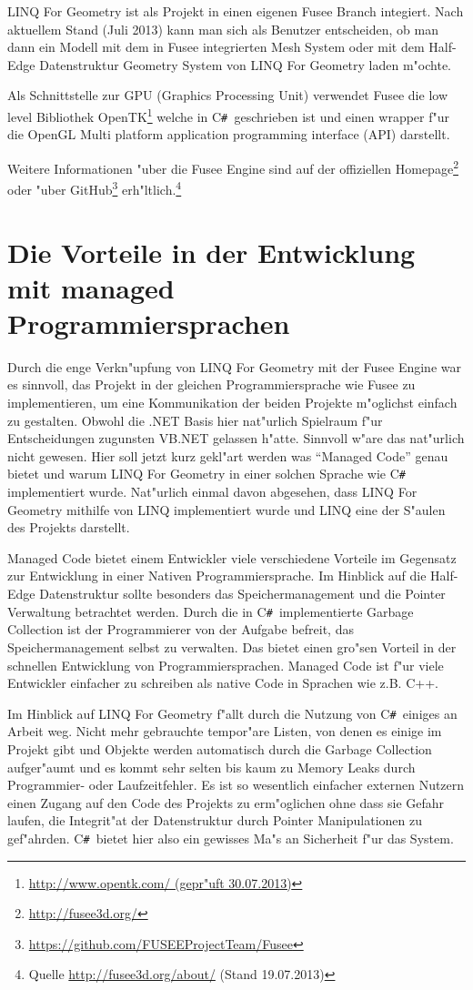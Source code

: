 \documentclass[pagesize, paper=a4, fontsize=12pt,titlepage=true, headings=small, headnosepline, abstractoff, liststotoc, nochapterprefix, plainheadsepline]{scrreprt}
\newcommand{\CSS}{C\texttt{\# }}
\newcommand{\LFGS}{LINQ For Geometry }
\newcommand{\HES}{Half-Edge Datenstruktur }
\begin{document}
\LFGS ist als Projekt in einen eigenen Fusee Branch integiert. Nach aktuellem Stand (Juli 2013) kann man sich als Benutzer entscheiden, ob man dann ein Modell mit dem in Fusee integrierten Mesh System oder mit dem \HES Geometry System von \LFGS laden m"ochte.

Als Schnittstelle zur GPU (Graphics Processing Unit) verwendet Fusee die low level Bibliothek OpenTK\footnote{\url{http://www.opentk.com/ (gepr"uft 30.07.2013)}} welche in \CSS geschrieben ist und einen wrapper f"ur die OpenGL Multi platform application programming interface (API) darstellt.

Weitere Informationen "uber die Fusee Engine sind auf der offiziellen Homepage\footnote{\url{http://fusee3d.org/}} oder "uber GitHub\footnote{\url{https://github.com/FUSEEProjectTeam/Fusee}} erh"ltlich.\footnote{Quelle \url{http://fusee3d.org/about/} (Stand 19.07.2013)}
\section {Die Vorteile in der Entwicklung mit managed Programmiersprachen}\label{sec:VorteileManaged}
Durch die enge Verkn"upfung von \LFGS mit der Fusee Engine war es sinnvoll, das Projekt in der gleichen Programmiersprache wie Fusee zu implementieren, um eine Kommunikation der beiden Projekte m"oglichst einfach zu gestalten. Obwohl die .NET Basis hier nat"urlich Spielraum f"ur Entscheidungen zugunsten VB.NET gelassen h"atte. Sinnvoll w"are das nat"urlich nicht gewesen. Hier soll jetzt kurz gekl"art werden was "`Managed Code"' genau bietet und warum \LFGS in einer solchen Sprache wie \CSS implementiert wurde. Nat"urlich einmal davon abgesehen, dass \LFGS mithilfe von LINQ implementiert wurde und LINQ eine der S"aulen des Projekts darstellt.

		Managed Code bietet einem Entwickler viele verschiedene Vorteile im Gegensatz zur Entwicklung in einer Nativen Programmiersprache. Im Hinblick auf die \HES sollte besonders das Speichermanagement und die Pointer Verwaltung betrachtet werden. Durch die in \CSS implementierte Garbage Collection ist der Programmierer von der Aufgabe befreit, das Speichermanagement selbst zu verwalten. Das bietet einen gro"sen Vorteil in der schnellen Entwicklung von Programmiersprachen. Managed Code ist f"ur viele Entwickler einfacher zu schreiben als native Code in Sprachen wie z.B. C++.

Im Hinblick auf \LFGS f"allt durch die Nutzung von \CSS einiges an Arbeit weg. Nicht mehr gebrauchte tempor"are Listen, von denen es einige im Projekt gibt und Objekte werden automatisch durch die Garbage Collection aufger"aumt und es kommt sehr selten bis kaum zu Memory Leaks durch Programmier- oder Laufzeitfehler. Es ist so wesentlich einfacher externen Nutzern einen Zugang auf den Code des Projekts zu erm"oglichen ohne dass sie Gefahr laufen, die Integrit"at der Datenstruktur durch Pointer Manipulationen zu gef"ahrden. \CSS bietet hier also ein gewisses Ma"s an Sicherheit f"ur das System.
\end{document}
